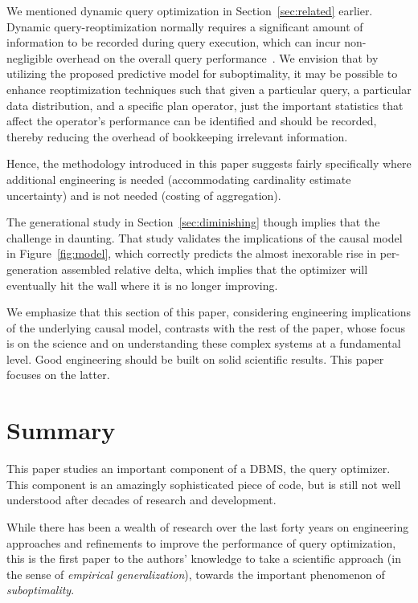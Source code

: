 \documentclass[prodmode,acmtods]{acmsmall}
\begin{document}
We mentioned dynamic query optimization in Section~\ref{sec:related}
earlier.  Dynamic query-reoptimization normally requires a significant
amount of information to be recorded during query execution, which can incur
non-negligible overhead on the overall query
performance~\cite{Avnur,kabra98}.  We envision that by utilizing the
proposed predictive model for suboptimality, it may be possible to enhance
reoptimization techniques such that given a particular query, a particular
data distribution, and a specific plan operator, just the important
statistics that affect the operator's performance can be identified and
should be recorded, thereby reducing the overhead of bookkeeping irrelevant
\hbox{information}.

Hence, the methodology introduced in this paper suggests fairly specifically where additional
engineering is needed (accommodating cardinality estimate uncertainty) and is not
needed (costing of aggregation).

The generational study in Section~\ref{sec:diminishing} though implies that
the challenge in daunting. That study validates the implications of the
causal model in Figure~\ref{fig:model}, which correctly predicts the almost
inexorable rise in per-generation assembled relative delta, which implies that the
optimizer will eventually hit the wall where it is no longer improving.

We emphasize that this section of this paper, considering engineering
implications of the underlying causal model, contrasts with the rest of the
paper, whose focus is on the science and on understanding these complex
systems at a fundamental level.  Good engineering should be built on solid
scientific results. This paper focuses on the latter.

\section{Summary}\label{sec:summary}

This paper studies an important
component of a \hbox{DBMS}, the query optimizer. This component is an amazingly
sophisticated piece of code, but is still not well understood after decades
of research and development.

While there has been a wealth of research over the last forty years on
engineering approaches and refinements to improve the performance of query
optimization, this is the first paper to the authors' knowledge to take a
scientific approach (in the sense of {\em empirical generalization}),
towards the important phenomenon of {\em suboptimality}.
\end{document}
